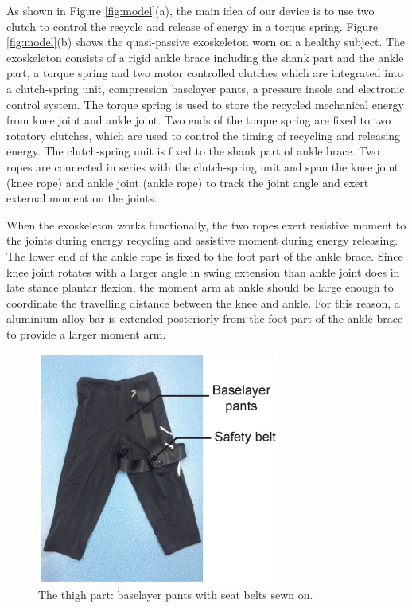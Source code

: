 \documentclass[twocolumn,cleanfoot,10pt]{asme2ej}
\begin{document}
As shown in Figure \ref{fig:model}(a), the main idea of our device is to use two clutch to control the recycle and release of energy in a torque spring. Figure \ref{fig:model}(b) shows the quasi-passive exoskeleton worn on a healthy subject. The exoskeleton consists of a rigid ankle brace including the shank part and the ankle part, a torque spring and two motor controlled clutches which are integrated into a clutch-spring unit, compression baselayer pants, a pressure insole and electronic control system. The torque spring is used to store the recycled mechanical energy from knee joint and ankle joint. Two ends of the torque spring are fixed to two rotatory clutches, which are used to control the timing of recycling and releasing energy. The clutch-spring unit is fixed to the shank part of ankle brace. Two ropes are connected in series with the clutch-spring unit and span the knee joint (knee rope) and ankle joint (ankle rope) to track the joint angle and exert external moment on the joints. 

When the exoskeleton works functionally, the two ropes exert resistive moment to the joints during energy recycling and assistive moment during energy releasing. The lower end of the ankle rope is fixed to the foot part of the ankle brace. Since knee joint rotates with a larger angle in swing extension than ankle joint does in late stance plantar flexion, the moment arm at ankle should be large enough to coordinate the travelling distance between the knee and ankle. For this reason, a aluminium alloy bar is extended posteriorly from the foot part of the ankle brace to provide a larger moment arm. 

\begin{figure}[b]
	\centering
	\includegraphics[width=8cm]{Figure3.eps}
	\caption{The thigh part: baselayer pants with seat belts sewn on.}
	\label{fig:pants}   
\end{figure}
\end{document}
